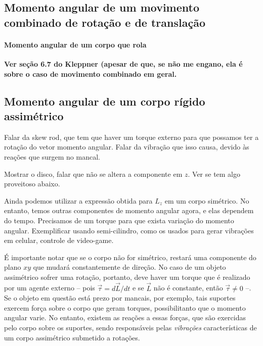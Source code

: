 \subsection{Momento angular de um movimento combinado de rotação e de translação}

\paragraph{Momento angular de um corpo que rola}

\textbf{Ver seção 6.7 do Kleppner (apesar de que, se não me engano, ela é sobre o caso de movimento combinado em geral.}

\subsection{Momento angular de um corpo rígido assimétrico}

Falar da skew rod, que tem que haver um torque externo para que possamos ter a rotação do vetor momento angular. Falar da vibração que isso causa, devido às reações que surgem no mancal.

Mostrar o disco, falar que não se altera a componente em $z$. Ver se tem algo proveitoso abaixo.


Ainda podemos utilizar a expressão obtida para $L_z$ em um corpo simétrico. No entanto, temos outras componentes de momento angular agora, e elas dependem do tempo. Precisamos de um torque para que exista variação do momento angular. Exemplificar usando semi-cilindro, como os usados para gerar vibrações em celular, controle de video-game.

É importante notar que se o corpo não for simétrico, restará uma componente do plano $xy$ que mudará constantemente de direção. No caso de um objeto assimétrico sofrer uma rotação, portanto, deve haver um torque que é realizado por um agente externo -- pois $\vec{\tau} = d\vec{L} / dt$ e se $\vec{L}$ não é constante, então $\vec{\tau} \neq 0$ --. Se o objeto em questão está prezo por mancais, por exemplo, tais suportes exercem força sobre o corpo que geram torques, possibilitanto que o momento angular varie. No entanto, existem as reações a essas forças, que são exercidas pelo corpo sobre os suportes, sendo responsáveis pelas \emph{vibrações} características de um corpo assimétrico submetido a rotações.

